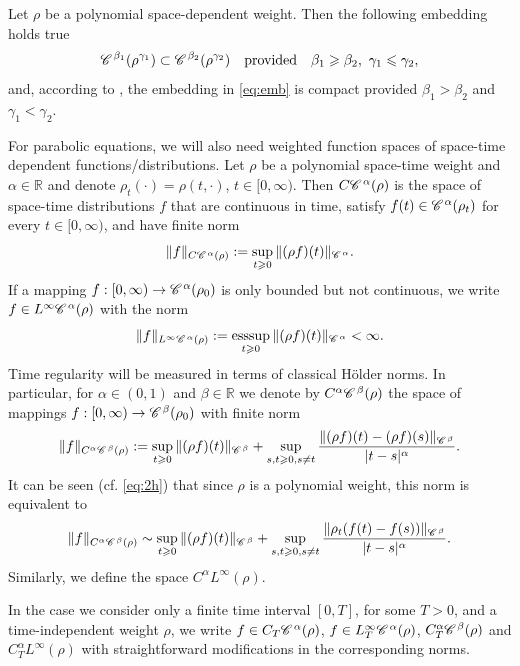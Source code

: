 \documentclass[a4paper,11pt]{article}
\renewcommand{\geq}{\geqslant}
\numberwithin{equation}{section}
\newcommand{\CC}{\mathscr{C} \hspace{.1em}}
\newcommand{\R}{\mathbb{R}}
\newcommand{\8}{\infty}
\DeclareMathOperator{\esssup}{esssup}
\begin{document}
Let $\rho$ be a polynomial space-dependent weight. Then the following embedding holds true
\begin{equation}\label{eq:emb}
\CC^{\beta_1}(\rho^{\gamma_1})\subset \CC^{\beta_2}(\rho^{\gamma_2}) \quad\text{provided}\quad \beta_1\geq\beta_2,\ \gamma_1\leqslant \gamma_2,
\end{equation}
and, according to \cite[Theorem 6.31]{T06}, the embedding in \eqref{eq:emb} is compact provided  $ \beta_1>\beta_2$ and $\gamma_1< \gamma_2$.



For parabolic equations, we will also need weighted   function spaces of space-time dependent functions/distributions. Let $\rho$ be a polynomial space-time weight and $\alpha\in\R$ and denote $\rho_{t}(\cdot)=\rho(t,\cdot)$, $t\in[0,\8)$.  Then $C\CC^{\alpha}(\rho)$ is the space of space-time distributions $f$ that are continuous in time, satisfy  $f(t)\in\CC^{\alpha}(\rho_{t})$ for every $t\in[0,\infty)$, and have finite norm
\[
\|f\|_{C\CC^{\alpha}(\rho)}:=\sup_{t\geq 0} \|(\rho f)(t)\|_{\CC^{\alpha}}.
\]
If a mapping $f:[0,\infty)\to  \CC^{\alpha}(\rho_{0}) $ is only bounded but not continuous, we write $f\in L^{\infty}\CC^{\alpha}(\rho)$ with the norm
\[
\|f\|_{L^{\infty}\CC^{\alpha}(\rho)}:=\esssup_{t\geq 0} \|(\rho f)(t)\|_{\CC^{\alpha}}<\8.
\]
Time regularity will be measured in terms of classical H\"older norms. In particular, for $\alpha\in(0,1)$ and $\beta\in\R$ we denote by $C^{\alpha}\CC^{\beta}(\rho)$  the space of mappings $f:[0,\infty)\to  \CC^{\beta}(\rho_{0}) $ with finite norm
$$
\|f\|_{C^{\alpha}\CC^{\beta}(\rho)}:=\sup_{t\geq 0} \|(\rho f)(t)\|_{\CC^{\beta}}+\sup_{s,t\geq 0,s\neq t} \frac{\|(\rho f)(t)-(\rho f)(s)\|_{\CC^{\beta}}}{|t-s|^{\alpha}}.
$$
It can be seen (cf. \eqref{eq:2h}) that since $\rho$ is a polynomial weight, this norm is equivalent to
\begin{equation}\label{eq:teq}
\|f\|_{C^{\alpha}\CC^{\beta}(\rho)}\sim\sup_{t\geq 0} \|(\rho f)(t)\|_{\CC^{\beta}}+\sup_{s,t\geq 0,s\neq t} \frac{\|\rho_{t}(f(t)- f(s))\|_{\CC^{\beta}}}{|t-s|^{\alpha}}.
\end{equation}
Similarly, we define the space $C^{\alpha}L^{\8}(\rho)$. 


In the case we consider only a finite time interval $[0,T]$, for some $T>0$, and a time-independent weight $\rho$, we write $f\in C_{T}\CC^{\alpha}(\rho)$, $f\in L^{\infty}_{T}\CC^{\alpha}(\rho)$, $C_{T}^{\alpha}\CC^{\beta}(\rho)$ and $C_{T}^{\alpha}L^{\8}(\rho)$ with straightforward modifications in the corresponding norms.
\end{document}
